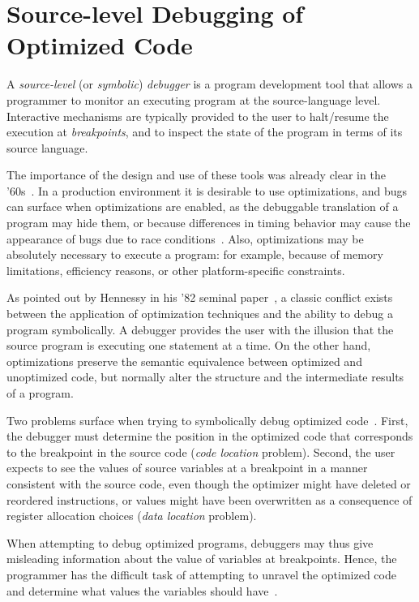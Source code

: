 \section{Source-level Debugging of Optimized Code}
\label{se:CS-debug}
A {\em source-level} (or {\em symbolic}) {\em debugger} is a program development tool that allows a programmer to monitor an executing program at the source-language level. Interactive mechanisms are typically provided to the user to halt/resume the execution at {\em breakpoints}, and to inspect the state of the program in terms of its source language.

The importance of the design and use of these tools was already clear in the '60s~\cite{Evans66}. In a production environment it is desirable to use optimizations, and bugs can surface when optimizations are enabled, as the debuggable translation of a program may hide them, or because differences in timing behavior may cause the appearance of bugs due to race conditions~\cite{Adl-Tabatabai96thesis}. Also, optimizations may be absolutely necessary to execute a program: for example, because of memory limitations, efficiency reasons, or other platform-specific constraints.

As pointed out by Hennessy in his '82 seminal paper~\cite{Hennessy82}, a classic conflict exists between the application of optimization techniques and the ability to debug a program symbolically. A debugger provides the user with the illusion that the source program is executing one statement at a time. On the other hand, optimizations preserve the semantic equivalence between optimized and unoptimized code, but normally alter the structure and the intermediate results of a program.

Two problems surface when trying to symbolically debug optimized code~\cite{Adl-Tabatabai96,Jaramillo00}. First, the debugger must determine the position in the optimized code that corresponds to the breakpoint in the source code ({\em code location} problem). Second, the user expects to see the values of source variables at a breakpoint in a manner consistent with the source code, even though the optimizer might have 
deleted or reordered instructions, or values might have been overwritten as a consequence of register allocation choices ({\em data location} problem).

\noindent When attempting to debug optimized programs, debuggers may thus give misleading information about the value of variables at breakpoints. Hence, the programmer has the difficult task of attempting to unravel the optimized code and determine what values the variables should have~\cite{Hennessy82}.

